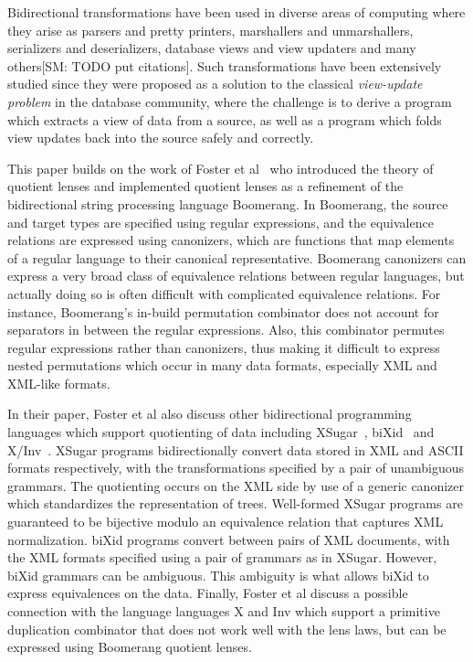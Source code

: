 \documentclass{svproc}
\newcommand{\FINISH}[3]{\ifdraft\textcolor{#1}{[#2: #3]}\fi}
\newcommand{\sam}[1]{\FINISH{dkpurple}{SM}{#1}}
\begin{document}
Bidirectional transformations have been used in diverse areas of computing
where they arise as parsers and pretty printers, marshallers
and unmarshallers, serializers and deserializers, database views and view
updaters and many others\sam{TODO put citations}. Such transformations have
been extensively studied since they were proposed as a solution to the classical
{\em view-update problem} in the database community, where the challenge is to
derive a program which extracts a view of data from a source, as well as a
program which folds view updates back into the source safely and correctly.

This paper builds on the work of Foster et al~\cite{quotientlenses} who
introduced the theory of quotient lenses and implemented quotient lenses as a
refinement of the bidirectional string processing language Boomerang.
In Boomerang, the source and target types are specified using regular
expressions, and the equivalence relations are expressed using canonizers, which
are functions that map elements of a regular language to their canonical
representative. Boomerang canonizers can express a very broad class of
equivalence relations between regular languages, but actually doing so is often
difficult with complicated equivalence relations. For instance, Boomerang's
in-build permutation combinator does not account for separators in between the
regular expressions. Also, this combinator permutes regular expressions rather
than canonizers, thus making it difficult to express nested permutations which
occur in many data formats, especially XML and XML-like formats.

In their paper, Foster et al also discuss other bidirectional programming
languages which support quotienting of data including XSugar~\cite{xsugar},
biXid~\cite{bixid} and X/Inv~\cite{xinv}. XSugar programs bidirectionally
convert data stored in XML and ASCII formats respectively, with the
transformations specified by a pair of unambiguous grammars. The quotienting
occurs on the XML side by use of a generic canonizer which standardizes the
representation of trees. Well-formed XSugar programs are guaranteed to be
bijective modulo an equivalence relation that captures XML normalization. biXid
programs convert between pairs of XML documents, with the XML formats specified
using a pair of grammars as in XSugar. However, biXid grammars can be ambiguous.
This ambiguity is what allows biXid to express equivalences on the data.
Finally, Foster et al discuss a possible connection with the language languages
X and Inv which support a primitive duplication combinator that does not work
well with the lens laws, but can be expressed using Boomerang quotient lenses.
\end{document}
